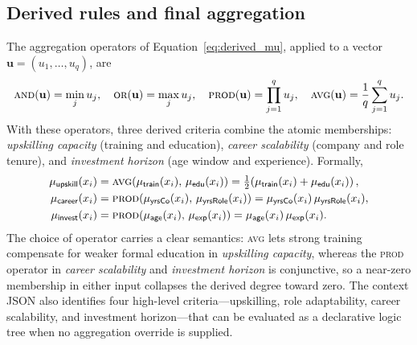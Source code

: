\documentclass{interact}
\begin{document}
\subsection{Derived rules and final aggregation}\label{app:context_math_derived}

The aggregation operators of Equation~\eqref{eq:derived_mu}, applied to a vector $\mathbf{u}=(u_1,\ldots,u_q)$, are
\begin{equation}
\textsc{and}(\mathbf{u})=\min_{j} u_j,\quad
\textsc{or}(\mathbf{u})=\max_{j} u_j,\quad
\textsc{prod}(\mathbf{u})=\prod_{j=1}^{q} u_j,\quad
\textsc{avg}(\mathbf{u})=\frac{1}{q}\sum_{j=1}^{q} u_j.
\label{eq:agg_ops}
\end{equation}
With these operators, three derived criteria combine the atomic memberships: \emph{upskilling capacity} (training and education), \emph{career scalability} (company and role tenure), and \emph{investment horizon} (age window and experience). Formally,
\begin{align}
\mu_{\textsf{upskill}}(x_i) &= \textsc{avg}\!\left(\mu_{\textsf{train}}(x_i),\,\mu_{\textsf{edu}}(x_i)\right)
= \tfrac{1}{2}\!\left(\mu_{\textsf{train}}(x_i)+\mu_{\textsf{edu}}(x_i)\right), \label{eq:der_upskill}\\
\mu_{\textsf{career}}(x_i) &= \textsc{prod}\!\left(\mu_{\textsf{yrsCo}}(x_i),\,\mu_{\textsf{yrsRole}}(x_i)\right)
= \mu_{\textsf{yrsCo}}(x_i)\,\mu_{\textsf{yrsRole}}(x_i), \label{eq:der_career}\\
\mu_{\textsf{invest}}(x_i) &= \textsc{prod}\!\left(\mu_{\textsf{age}}(x_i),\,\mu_{\textsf{exp}}(x_i)\right)
= \mu_{\textsf{age}}(x_i)\,\mu_{\textsf{exp}}(x_i). \label{eq:der_invest}
\end{align}
The choice of operator carries a clear semantics: \textsc{avg} lets strong training compensate for weaker formal education in \emph{upskilling capacity}, whereas the \textsc{prod} operator in \emph{career scalability} and \emph{investment horizon} is conjunctive, so a near-zero membership in either input collapses the derived degree toward zero. The context JSON also identifies four high-level criteria---upskilling, role adaptability, career scalability, and investment horizon---that can be evaluated as a declarative logic tree when no aggregation override is supplied.
\end{document}
